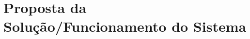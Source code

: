 \section{Proposta da Solução/Funcionamento do Sistema} %
\label{sec:proposta_da_solu_o_funcionamento_do_sistema}

